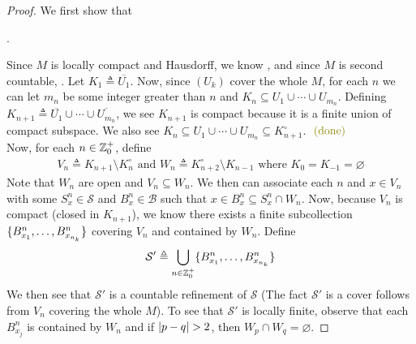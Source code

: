 \documentclass{report}
\begin{document}
\begin{proof}
We first show that 
\begin{center}
   \begin{minipage}{0.9\linewidth}  
     . 
   \end{minipage}
\end{center}
Since $M$ is locally compact and Hausdorff, we know , and since $M$ is second countable, . Let $K_1\triangleq \overline{U_1}$. Now, since $(U_k)$ cover the whole $M$,  for each $n$ we can let  $m_n$ be some integer greater than  $n$ and  $K_n\subseteq U_1\cup  \cdots \cup  U_{m_n}$. Defining $K_{n+1}\triangleq \overline{U_1}\cup  \cdots \cup \overline{U_{m_n}}$, we see $K_{n+1}$ is compact because it is a finite union of compact subspace. We also see $K_n \subseteq U_1 \cup \cdots \cup  U_{m_n}\subseteq K_{n+1}^{\circ }$. $\odone$ \\

Now, for each $n\in\mathbb{Z}_0^+$, define 
\begin{align*}
  V_n \triangleq K_{n+1}\setminus K_n^{\circ }\text{ and }W_n \triangleq K_{n+2}^{\circ } \setminus K_{n-1}\text{ where }K_0=K_{-1}=\varnothing
\end{align*}
Note that $W_n$ are open and $V_n \subseteq W_n$. We then can associate each  $n$ and $x \in V_n$ with some $S^n_x \in \mathcal{S}$ and $B^n_x \in \mathcal{B}$ such that $x \in B^n_x \subseteq S^n_x\cap W_n$. Now, because $V_n$ is compact  (closed in $K_{n+1}$), we know there exists a finite subcollection $\{ B^n_{x_1},\dots ,B^n_{x_{n_k}} \}$ covering $V_n$ and contained by  $W_n$. Define 
\begin{align*}
\mathcal{S}'\triangleq \bigcup_{n\in\mathbb{Z}_0^+} \{ B^n_{x_1},\dots , B^n_{x_{n_k}} \}
\end{align*}
We then see that $\mathcal{S}'$ is a countable refinement of $\mathcal{S}$ (The fact $\mathcal{S}'$ is a cover follows from $V_n$ covering the whole  $M$). To see that $\mathcal{S}'$ is locally finite, observe that each $B^n_{x_j}$ is contained by $W_n$ and if  $\abso{p-q}>2$, then $W_p\cap W_q=\varnothing$. 
\end{proof}
\end{document}
